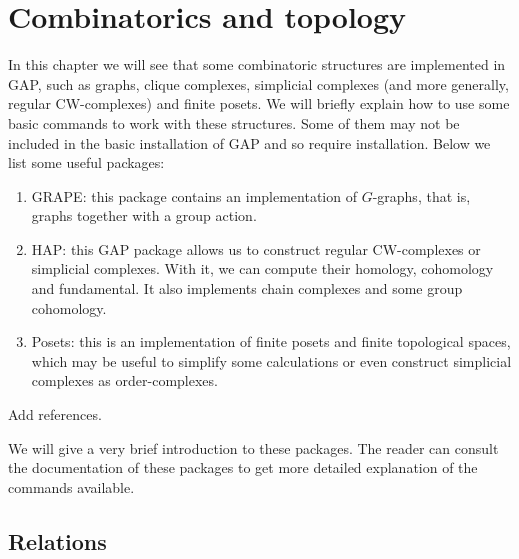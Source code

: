 \chapter{Combinatorics and topology}

In this chapter we will see that some combinatoric structures are implemented in GAP, such as graphs, clique complexes, simplicial complexes (and more generally, regular CW-complexes) and finite posets.
We will briefly explain how to use some basic commands to work with these structures.
Some of them may not be included in the basic installation of GAP and so require installation.
Below we list some useful packages:

\begin{enumerate}
    \item GRAPE: this package contains an implementation of $G$-graphs, that is, graphs together with a group action.
    
    \item HAP: this GAP package allows us to construct regular CW-complexes or simplicial complexes. With it, we can compute their homology, cohomology and fundamental. It also implements chain complexes and some group cohomology.
    
    \item Posets: this is an implementation of finite posets and finite topological spaces, which may be useful to simplify some calculations or even construct simplicial complexes as order-complexes.
\end{enumerate}

{\color{red} Add references.}

We will give a very brief introduction to these packages. The reader can consult the documentation of these packages to get more detailed explanation of the commands available.

\section{Relations}

